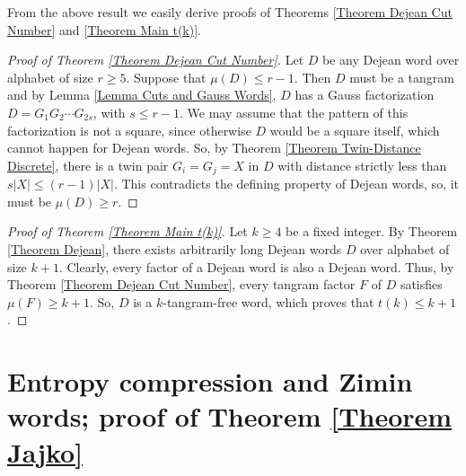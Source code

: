 \documentclass[12pt]{amsart}
\theoremstyle{plain}
\numberwithin{equation}{section}
\begin{document}
From the above result we easily derive proofs of Theorems \ref{Theorem Dejean Cut Number} and \ref{Theorem Main t(k)}.

\begin{proof}[Proof of Theorem \ref{Theorem Dejean Cut Number}]
	Let $D$ be any Dejean word over alphabet of size $r\geqslant 5$. Suppose that $\mu(D)\leqslant r-1$. Then $D$ must be a tangram and by Lemma \ref{Lemma Cuts and Gauss Words}, $D$ has a Gauss factorization $D=G_1G_2\cdots G_{2s}$, with $s\leqslant r-1$. We may assume that the pattern of this factorization is not a square, since otherwise $D$ would be a square itself, which cannot happen for Dejean words. So, by Theorem \ref{Theorem Twin-Distance Discrete}, there is a twin pair $G_i=G_j=X$ in $D$ with distance strictly less than $s|X|\leqslant (r-1)|X|$. This contradicts the defining property of Dejean words, so, it must be $\mu(D)\geqslant r$.
\end{proof}

\begin{proof}[Proof of Theorem \ref{Theorem Main t(k)}]
	Let $k\geqslant 4$ be a fixed integer. By Theorem \ref{Theorem Dejean}, there exists arbitrarily long Dejean words $D$ over alphabet of size $k+1$. Clearly, every factor of a Dejean word is also a Dejean word. Thus, by Theorem \ref{Theorem Dejean Cut Number}, every tangram factor $F$ of $D$ satisfies $\mu(F)\geqslant k+1$. So, $D$ is a $k$-tangram-free word, which proves that $t(k)\leqslant k+1$.
\end{proof}


	\section{Entropy compression and Zimin words; proof of Theorem \ref{Theorem Jajko}}\label{Section Entropy}
	
\end{document}
